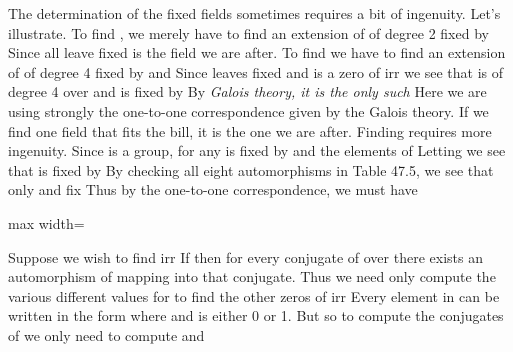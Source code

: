 \documentclass[11pt,oneside]{article}
\begin{document}
\begin{BookBody}
The determination of the fixed fields  sometimes requires a bit of ingenuity. Let’s illustrate. To find , we merely have to find an extension of  of degree 2 fixed by  Since all  leave  fixed is the field we are after. To find  we have to find an extension of  of degree 4 fixed by \BookInline{\iota } and  Since \BookInline{\mu } leaves \BookInline{\alpha } fixed and \BookInline{\alpha } is a zero of irr we see that  is of degree 4 over  and is fixed by  By\textit{ Galois theory, it is the only such}  Here we are using strongly the one-to-one correspondence given by the Galois theory. If we find one field that fits the bill, it is the one we are after. Finding  requires more ingenuity. Since  is a group, for any  is fixed by \BookInline{\iota } and  the elements of  Letting \BookInline{\beta = \alpha } we see that  is fixed by  By checking all eight automorphisms in Table 47.5, we see that only \BookInline{\iota } and  fix  Thus by the one-to-one correspondence, we must have

\begin{center}\begin{adjustbox}{max width=\linewidth}\end{adjustbox}\end{center}

Suppose we wish to find irr If  then for every conjugate of \BookInline{\gamma } over  there exists an automorphism of  mapping \BookInline{\gamma } into that conjugate. Thus we need only compute the various different values \BookInline{\sigma (\gamma )} for  to find the other zeros of irr Every element in  can be written in the form  where  and  is either 0 or 1. But  so to compute the conjugates of  we only need to compute  and 


\end{BookBody}
\end{document}
